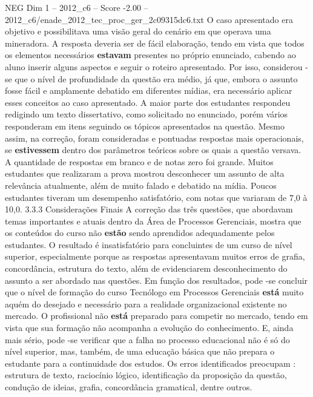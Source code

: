 \begin{textsample}{NEG Dim 1 – 2012\_c6 – Score -2.00 – 2012\_c6/enade\_2012\_tec\_proc\_ger\_2c09315dc6.txt}
O caso apresentado era objetivo e possibilitava uma visão geral do cenário em que operava uma mineradora.
A resposta deveria ser de fácil elaboração, tendo em vista que todos os elementos necessários \textbf{estavam} presentes no próprio enunciado, cabendo ao aluno inserir alguns aspectos e seguir o roteiro apresentado.
Por isso, considerou -se que o nível de profundidade da questão era médio, já que, embora o assunto fosse fácil e amplamente debatido em diferentes mídias, era necessário aplicar esses conceitos ao caso apresentado.
A maior parte dos estudantes respondeu redigindo um texto dissertativo, como solicitado no enunciado, porém vários responderam em itens seguindo os tópicos apresentados na questão.
Mesmo assim, na correção, foram consideradas e pontuadas respostas mais operacionais, se \textbf{estivessem} dentro dos parâmetros teóricos sobre os quais a questão versava.
A quantidade de respostas em branco e de notas zero foi grande.
Muitos estudantes que realizaram a prova mostrou desconhecer um assunto de alta relevância atualmente, além de muito falado e debatido na mídia.
Poucos estudantes tiveram um desempenho satisfatório, com notas que variaram de 7,0 à 10,0. 3.3.3 Considerações Finais A correção das três questões, que abordavam temas importantes e atuais dentro da Área de Processos Gerenciais, mostra que os conteúdos do curso não \textbf{estão} sendo aprendidos adequadamente pelos estudantes.
O resultado é insatisfatório para concluintes de um curso de nível superior, especialmente porque as respostas apresentavam muitos erros de grafia, concordância, estrutura do texto, além de evidenciarem desconhecimento do assunto a ser abordado nas questões.
Em função dos resultados, pode -se concluir que o nível de formação do curso Tecnólogo em Processos Gerenciais \textbf{está} muito aquém do desejado e necessário para a realidade organizacional existente no mercado.
O profissional não \textbf{está} preparado para competir no mercado, tendo em vista que sua formação não acompanha a evolução do conhecimento.
E, ainda mais sério, pode -se verificar que a falha no processo educacional não é só do nível superior, mas, também, de uma educação básica que não prepara o estudante para a continuidade dos estudos.
Os erros identificados preocupam : estrutura de texto, raciocínio lógico, identificação da proposição da questão, condução de ideias, grafia, concordância gramatical, dentre outros.

\end{textsample}
